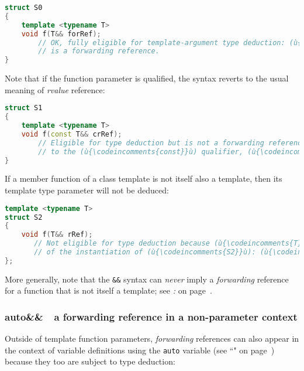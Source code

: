 \begin{lstlisting}[language=C++]
struct S0
{
    template <typename T>
    void f(T&& forRef);
        // OK, fully eligible for template-argument type deduction: (ù{\codeincomments{forRef}}ù) 
        // is a forwarding reference.
}
\end{lstlisting}
    
\noindent Note that if the function parameter is qualified, the syntax reverts to
the usual meaning of \emph{rvalue} reference:

\begin{lstlisting}[language=C++]
struct S1
{
    template <typename T>
    void f(const T&& crRef);
        // Eligible for type deduction but is not a forwarding reference: due
        // to the (ù{\codeincomments{const}}ù) qualifier, (ù{\codeincomments{crRef}}ù) is an *rvalue* reference.
}
\end{lstlisting}
    
\noindent If a member function of a class template is not itself also a template,
then its template type parameter will not be deduced:

\begin{lstlisting}[language=C++]
template <typename T>
struct S2
{
    void f(T&& rRef);
       // Not eligible for type deduction because (ù{\codeincomments{T}}ù) is fixed and known as part 
       // of the instantiation of (ù{\codeincomments{S2}}ù): (ù{\codeincomments{rRef}}ù) is an *rvalue* reference.
};
\end{lstlisting}
    
\noindent More generally, note that the \texttt{\&\&} syntax can \emph{never}
imply a \emph{forwarding} reference for a function that is not itself a
template; see \textit{: 
} on page~\pageref{forwarding-references-look-just-like-rvalue-references}.

\subsubsection[{\tt auto\&\&} --- a forwarding reference in a non-parameter context]{{\SubsubsecCode auto\&\&}~{\subsubemdash}~a forwarding reference in a non-parameter context}\label{auto-a-forwarding-reference-in-a-non-parameter-context}

Outside of template function parameters, \emph{forwarding} references
can also appear in the context of variable definitions using the
\texttt{auto} variable (see ``" on page~\pageref{auto-feature}) because they too are subject to type
deduction:

